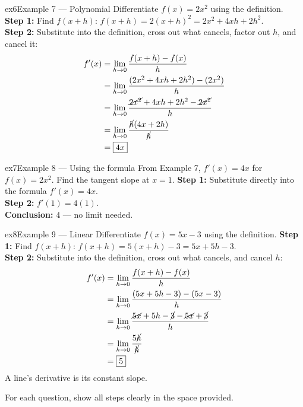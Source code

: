 \documentclass[11pt]{article}
\begin{document}
\begin{example}{ex6}{Example 7 --- Polynomial}
Differentiate $f(x)=2x^2$ using the definition.\soln
\textbf{Step 1:} Find $f(x+h)$: $f(x+h)=2(x+h)^2=2x^2+4xh+2h^2$.\\[3pt]
\textbf{Step 2:} Substitute into the definition, cross out what cancels, factor out $h$, and cancel it:
\begin{align*}
f'(x)&=\lim_{h\to0}\frac{f(x+h)-f(x)}{h}\\
&=\lim_{h\to0}\frac{(2x^2+4xh+2h^2)-(2x^2)}{h}\\
&=\lim_{h\to0}\frac{\cancel{2x^2}+4xh+2h^2-\cancel{2x^2}}{h}\\
&=\lim_{h\to0}\frac{\cancel{h}(4x+2h)}{\cancel{h}}\\
&=\boxed{4x}
\end{align*}
\end{example}

\begin{example}{ex7}{Example 8 --- Using the formula}
From Example 7, $f'(x)=4x$ for $f(x)=2x^2$. Find the tangent slope at $x=1$.\soln
\textbf{Step 1:} Substitute directly into the formula $f'(x)=4x$.\\[3pt]
\textbf{Step 2:} $f'(1)=4(1)$.\\[3pt]
\textbf{Conclusion:} $4$ --- no limit needed.
\end{example}

\begin{example}{ex8}{Example 9 --- Linear}
Differentiate $f(x)=5x-3$ using the definition.\soln
\textbf{Step 1:} Find $f(x+h)$: $f(x+h)=5(x+h)-3=5x+5h-3$.\\[3pt]
\textbf{Step 2:} Substitute into the definition, cross out what cancels, and cancel $h$:
\begin{align*}
f'(x)&=\lim_{h\to0}\frac{f(x+h)-f(x)}{h}\\
&=\lim_{h\to0}\frac{(5x+5h-3)-(5x-3)}{h}\\
&=\lim_{h\to0}\frac{\cancel{5x}+5h-\cancel{3}-\cancel{5x}+\cancel{3}}{h}\\
&=\lim_{h\to0}\frac{5\cancel{h}}{\cancel{h}}\\
&=\boxed{5}
\end{align*}
A line's derivative is its constant slope.
\end{example}

\clearpage
{}
For each question, show all steps clearly in the space provided.
\end{document}
